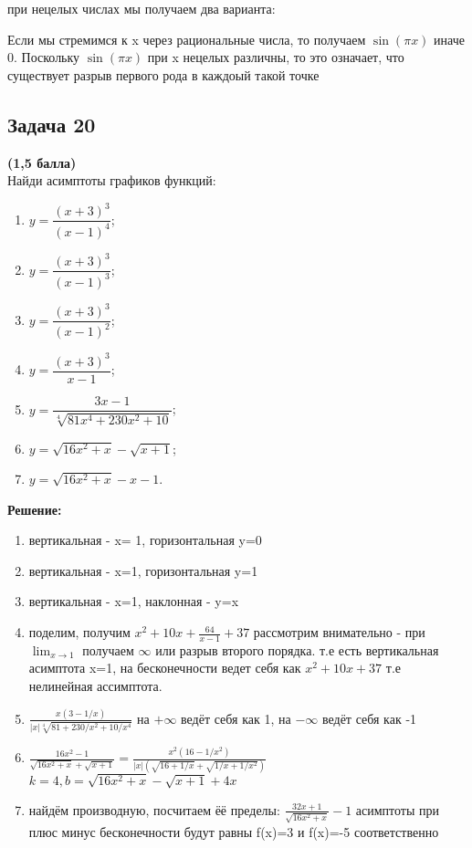\documentclass[a4paper,12pt]{article}
\begin{document}
при нецелых числах мы получаем два варианта: 

Если мы стремимся к x через рациональные числа, то получаем $\sin(\pi x)$ иначе 0. Поскольку $\sin(\pi x)$ при x нецелых различны, то это означает, что существует разрыв первого рода в каждоый такой точке

\subsection{Задача 20}
\textbf{(1,5 балла)} \\
Найди асимптоты графиков функций:
\begin{enumerate}[label=\alph*)]
    \item $y = \dfrac{(x + 3)^3}{(x - 1)^4}$;
    \item $y = \dfrac{(x + 3)^3}{(x - 1)^3}$;
    \item $y = \dfrac{(x + 3)^3}{(x - 1)^2}$;
    \item $y = \dfrac{(x + 3)^3}{x - 1}$;
    \item $y = \dfrac{3x - 1}{\sqrt[4]{81x^4 + 230x^2 + 10}}$;
    \item $y = \sqrt{16x^2 + x} - \sqrt{x + 1}$;
    \item $y = \sqrt{16x^2 + x} - x - 1$. 
\end{enumerate}
\textbf{Решение:}

\begin{enumerate}[label=\alph*)]
    \item вертикальная - x= 1, горизонтальная y=0
    \item вертикальная - x=1, горизонтальная y=1
    \item вертикальная - x=1, наклонная - y=x
    \item поделим, получим $x^2+10x+\frac{64}{x-1}+37$ рассмотрим внимательно - при $\lim_{x \to 1}$ получаем $\infty$ или разрыв второго порядка. т.е есть вертикальная асимптота x=1, на бесконечности ведет себя как $x^2+10x+37$ т.е нелинейная ассимптота.
    \item $\frac{x(3-1/x)}{|x|\sqrt[4]{81+230/x^2+10/x^4}}$ на $+\infty$ ведёт себя как 1, на $-\infty$ ведёт себя как -1
    \item $\frac{16x^2-1}{\sqrt{16x^2+x}+\sqrt{x+1}}=\frac{x^2(16-1/x^2)}{|x|(\sqrt{16+1/x}+\sqrt{1/x+1/x^2})}$ $k = 4, b = \sqrt{16x^{2}+x}-\sqrt{x+1}+4x$ 
    \item найдём производную, посчитаем ёё пределы: $\frac{32x+1}{\sqrt{16x^2+x}}-1$ асимптоты при плюс минус бесконечности будут равны f(x)=3 и f(x)=-5 соответственно
\end{enumerate}
\end{document}
